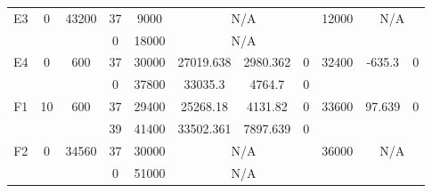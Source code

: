 \begin{sidewaystable}
\begin{tabular}{c||c|c||c|c|c|c|c||c|c|c}
         &
        
      \\
      \hline
      \multirow{2}{*}{E3} &
      \multirow{2}{*}{0} &
      \multirow{2}{*}{43200} &
      37 &
      9000 &
        \multicolumn{3}{|c||}{N/A} &
      \multirow{2}{*}{12000} &
        \multicolumn{2}{c}{\multirow{2}{*}{N/A}}
      \\
      \cline{4-8}
       &
       &
       &
      0 &
      18000 &
        \multicolumn{3}{|c||}{N/A} &
      
        
      \\
      \hline
      \multirow{2}{*}{E4} &
      \multirow{2}{*}{0} &
      \multirow{2}{*}{600} &
      37 &
      30000 &
        27019.638 &
        2980.362 &
        0 &
      \multirow{2}{*}{32400} &
        \multirow{2}{*}{-635.3} &
        \multirow{2}{*}{0}
      \\
      \cline{4-8}
       &
       &
       &
      0 &
      37800 &
        33035.3 &
        4764.7 &
        0 &
      
         &
        
      \\
      \hline
      \multirow{2}{*}{F1} &
      \multirow{2}{*}{10} &
      \multirow{2}{*}{600} &
      37 &
      29400 &
        25268.18 &
        4131.82 &
        0 &
      \multirow{2}{*}{33600} &
        \multirow{2}{*}{97.639} &
        \multirow{2}{*}{0}
      \\
      \cline{4-8}
       &
       &
       &
      39 &
      41400 &
        33502.361 &
        7897.639 &
        0 &
      
         &
        
      \\
      \hline
      \multirow{2}{*}{F2} &
      \multirow{2}{*}{0} &
      \multirow{2}{*}{34560} &
      37 &
      30000 &
        \multicolumn{3}{|c||}{N/A} &
      \multirow{2}{*}{36000} &
        \multicolumn{2}{c}{\multirow{2}{*}{N/A}}
      \\
      \cline{4-8}
       &
       &
       &
      0 &
      51000 &
        \multicolumn{3}{|c||}{N/A} &
      
        
      \\
\end{tabular}
\label{table:RDS2-7597.tex} 
\end{sidewaystable}
